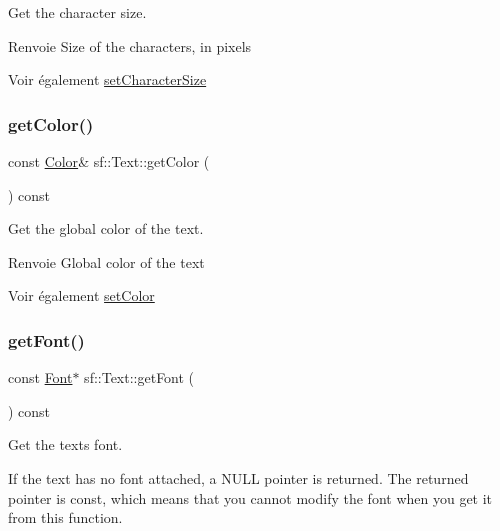 Get the character size. 

\begin{DoxyReturn}{Renvoie}
Size of the characters, in pixels
\end{DoxyReturn}
\begin{DoxySeeAlso}{Voir également}
\hyperlink{classsf_1_1Text_ae96f835fc1bff858f8a23c5b01eaaf7e}{set\+Character\+Size} 
\end{DoxySeeAlso}
\mbox{\label{classsf_1_1Text_ae4ca753f719c54692fd4d9284573a2c7}} 
\subsubsection{\texorpdfstring{get\+Color()}{getColor()}}
{\footnotesize\ttfamily const \hyperlink{classsf_1_1Color}{Color}\& sf\+::\+Text\+::get\+Color (\begin{DoxyParamCaption}{ }\end{DoxyParamCaption}) const}



Get the global color of the text. 

\begin{DoxyReturn}{Renvoie}
Global color of the text
\end{DoxyReturn}
\begin{DoxySeeAlso}{Voir également}
\hyperlink{classsf_1_1Text_afd1742fca1adb6b0ea98357250ffb634}{set\+Color} 
\end{DoxySeeAlso}
\mbox{\label{classsf_1_1Text_a47cd96d7b2c37b2f820e4d6e1bb83f96}} 
\subsubsection{\texorpdfstring{get\+Font()}{getFont()}}
{\footnotesize\ttfamily const \hyperlink{classsf_1_1Font}{Font}$\ast$ sf\+::\+Text\+::get\+Font (\begin{DoxyParamCaption}{ }\end{DoxyParamCaption}) const}



Get the text\textquotesingle{}s font. 

If the text has no font attached, a N\+U\+LL pointer is returned. The returned pointer is const, which means that you cannot modify the font when you get it from this function.

